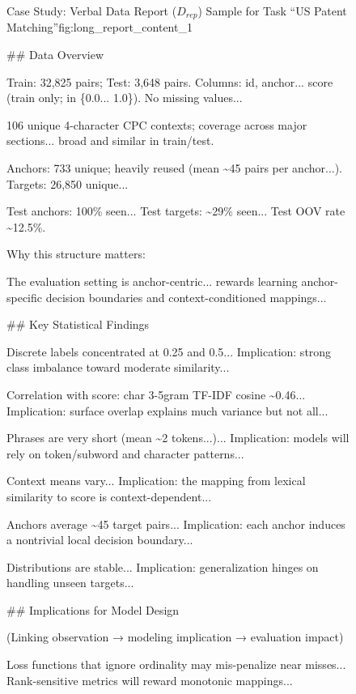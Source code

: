 \begin{figure}
    \centering

\begin{ReportFrame}{Case Study: Verbal Data Report ($D_{rep}$) Sample for Task ``US Patent Matching''}{fig:long_report_content_1}

\#\# Data Overview

Train: 32,825 pairs; Test: 3,648 pairs. Columns: id, anchor... score (train only; in \{0.0... 1.0\}). No missing values...

106 unique 4-character CPC contexts; coverage across major sections... broad and similar in train/test.

Anchors: 733 unique; heavily reused (mean \textasciitilde 45 pairs per anchor...). Targets: 26,850 unique...

Test anchors: 100\% seen... Test targets: \textasciitilde 29\% seen... Test OOV rate \textasciitilde 12.5\%.
\newline

Why this structure matters:

The evaluation setting is anchor-centric... rewards learning anchor-specific decision boundaries and context-conditioned mappings...
\newline

\#\# Key Statistical Findings

Discrete labels concentrated at 0.25 and 0.5... Implication: strong class imbalance toward moderate similarity...

Correlation with score: char 3-5gram TF-IDF cosine \textasciitilde 0.46... Implication: surface overlap explains much variance but not all...

Phrases are very short (mean \textasciitilde 2 tokens...)... Implication: models will rely on token/subword and character patterns...

Context means vary... Implication: the mapping from lexical similarity to score is context-dependent...

Anchors average \textasciitilde 45 target pairs... Implication: each anchor induces a nontrivial local decision boundary...

Distributions are stable... Implication: generalization hinges on handling unseen targets...
\newline

\#\# Implications for Model Design

(Linking observation → modeling implication → evaluation impact)

Loss functions that ignore ordinality may mis-penalize near misses... Rank-sensitive metrics will reward monotonic mappings...


\end{ReportFrame}
\end{figure}
